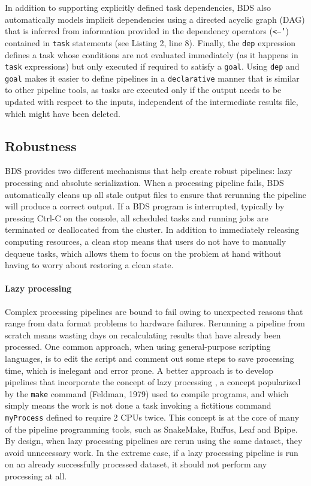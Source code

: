 In addition to supporting explicitly defined task dependencies, BDS also automatically models implicit dependencies using a directed acyclic graph (DAG) that is inferred from information provided in the dependency operators (\texttt{<–’}) contained in \texttt{task} statements (see Listing 2, line 8). Finally, the \texttt{dep} expression defines a task whose conditions are not evaluated immediately (as it happens in \texttt{task} expressions) but only executed if required to satisfy a \texttt{goal}. Using \texttt{dep} and \texttt{goal} makes it easier to define pipelines in a \texttt{declarative} manner that is similar to other pipeline tools, as tasks are executed only if the output needs to be updated with respect to the inputs, independent of the intermediate results file, which might have been deleted.

\subsection{Robustness}

BDS provides two different mechanisms that help create robust pipelines: lazy processing and absolute serialization. When a processing pipeline fails, BDS automatically cleans up all stale output files to ensure that rerunning the pipeline will produce a correct output. If a BDS program is interrupted, typically by pressing Ctrl-C on the console, all scheduled tasks and running jobs are terminated or deallocated from the cluster. In addition to immediately releasing computing resources, a clean stop means that users do not have to manually dequeue tasks, which allows them to focus on the problem at hand without having to worry about restoring a clean state.

\paragraph{Lazy processing} Complex processing pipelines are bound to fail owing to unexpected reasons that range from data format problems to hardware failures. Rerunning a pipeline from scratch means wasting days on recalculating results that have already been processed. One common approach, when using general-purpose scripting languages, is to edit the script and comment out some steps to save processing time, which is inelegant and error prone. A better approach is to develop pipelines that incorporate the concept of lazy processing \cite{napolitano2013bioinformatic}, a concept popularized by the \texttt{make} command (Feldman, 1979) used to compile programs, and which simply means the work is not done a task invoking a fictitious command \texttt{myProcess} defined to require 2 CPUs twice. This concept is at the core of many of the pipeline programming tools, such as SnakeMake, Ruffus, Leaf and Bpipe. By design, when lazy processing pipelines are rerun using the same dataset, they avoid unnecessary work. In the extreme case, if a lazy processing pipeline is run on an already successfully processed dataset, it should not perform any processing at all.

